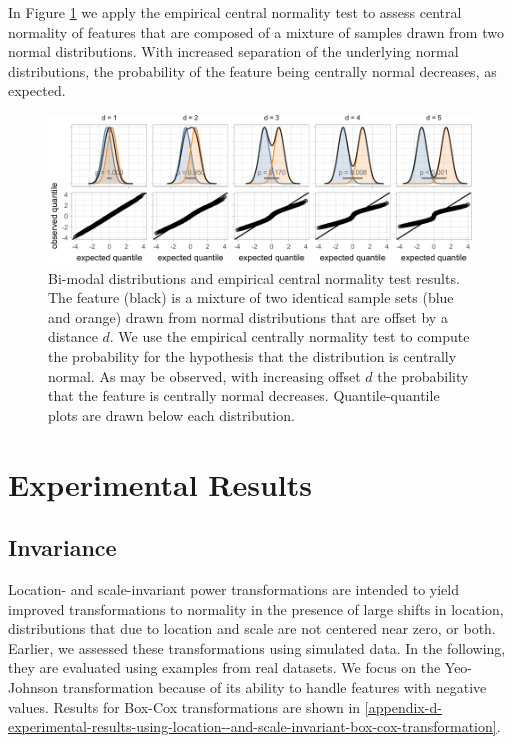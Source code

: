 \documentclass[preprint,12pt,authoryear]{elsarticle}
\begin{document}
In Figure \ref{fig:empirical-central-normality-examples} we apply the
empirical central normality test to assess central normality of features
that are composed of a mixture of samples drawn from two normal
distributions. With increased separation of the underlying normal
distributions, the probability of the feature being centrally normal
decreases, as expected.

\begin{figure}

{\centering \includegraphics[width=1\linewidth]{figure_7} 

}

\caption{Bi-modal distributions and empirical central normality test results. The feature (black) is a mixture of two identical sample sets (blue and orange) drawn from normal distributions that are offset by a distance $d$. We use the empirical centrally normality test to compute the probability for the hypothesis that the distribution is centrally normal. As may be observed, with increasing offset $d$ the probability that the feature is centrally normal decreases. Quantile-quantile plots are drawn below each distribution.}\label{fig:empirical-central-normality-examples}
\end{figure}

\section{Experimental Results}\label{experimental-results}

\subsection{Invariance}\label{sec:invariance}

Location- and scale-invariant power transformations are intended to
yield improved transformations to normality in the presence of large
shifts in location, distributions that due to location and scale are not
centered near zero, or both. Earlier, we assessed these transformations
using simulated data. In the following, they are evaluated using
examples from real datasets. We focus on the Yeo-Johnson transformation
because of its ability to handle features with negative values. Results
for Box-Cox transformations are shown in 
\ref{appendix-d-experimental-results-using-location--and-scale-invariant-box-cox-transformation}.
\end{document}

